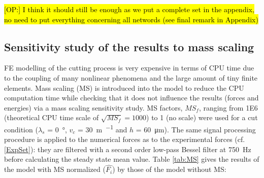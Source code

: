 \documentclass[preprint,12pt,times]{elsarticle}
\DeclareRobustCommand{\OP}[1]{ {\begingroup\sethlcolor{VWblue}\textcolor{black}{\hl{[OP:] #1}}\endgroup} }
\begin{document}
\OP{I think it should still be enough as we put a complete set in the appendix, no need to put everything concerning all networds (see final remark in Appendix)}

\subsection{Sensitivity study of the results to mass scaling}

FE modelling of the cutting process is very expensive in terms of CPU time due to the coupling of many nonlinear phenomena and the large amount of tiny finite elements. Mass scaling (MS) is introduced into the model to reduce the CPU computation time while checking that it does not influence the results (forces and energies) via a mass scaling sensitivity study. MS factors, ${MS}_f$, ranging from \num{1E6} (theoretical CPU time scale of $\sqrt{{MS}_f} = \num{1000}$) to 1 (no scale) were used for a cut condition ($\lambda_s$ = \qty{0}{\degree}, $v_c$ = \qty{30}{\m\per\min} and $h$ = \qty{60}{\um}). The same signal processing procedure is applied to the numerical forces as to the experimental forces (cf. \ref{ExpSet}): they are filtered with a second order low-pass Bessel filter at \qty{750}{\Hz} before calculating the steady state mean value. Table \ref{tab:MS} gives the results of the model with MS normalized ($\hat{F_i}$) by those of the model without MS:
\end{document}
